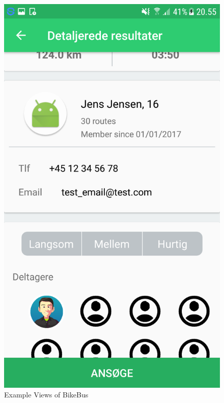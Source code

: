 \begin{figure}[H]
\begin{minipage}{0.32\textwidth}
    \includegraphics[width=0.8\linewidth]{Graphics/Images/bikebus_detail_2.png}
\end{minipage}
    \caption{Example Views of BikeBus}
    \label{fig:sample_figure}
\end{figure}
